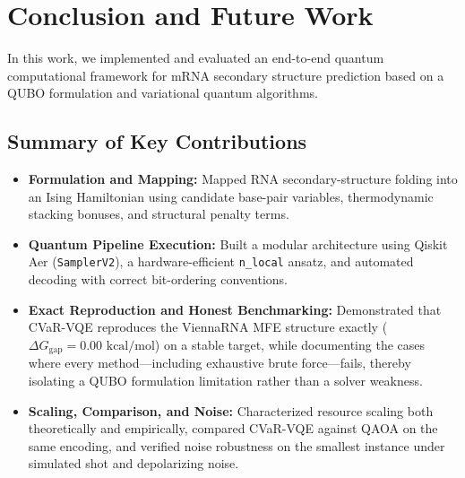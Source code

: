 \documentclass[11pt,a4paper]{article}
\begin{document}
	\section{Conclusion and Future Work}
	\label{sec:conclusion}
	
	In this work, we implemented and evaluated an end-to-end quantum computational framework for mRNA secondary structure prediction based on a QUBO formulation and variational quantum algorithms.
	
	\subsection{Summary of Key Contributions}
	\begin{itemize}[leftmargin=1.2cm]
		\item \textbf{Formulation and Mapping:} Mapped RNA secondary-structure folding into an Ising Hamiltonian using candidate base-pair variables, thermodynamic stacking bonuses, and structural penalty terms.
		\item \textbf{Quantum Pipeline Execution:} Built a modular architecture using Qiskit Aer (\texttt{SamplerV2}), a hardware-efficient \texttt{n\_local} ansatz, and automated decoding with correct bit-ordering conventions.
		\item \textbf{Exact Reproduction and Honest Benchmarking:} Demonstrated that CVaR-VQE reproduces the ViennaRNA MFE structure exactly ($\Delta G_{\text{gap}} = 0.00\text{ kcal/mol}$) on a stable target, while documenting the cases where every method---including exhaustive brute force---fails, thereby isolating a QUBO formulation limitation rather than a solver weakness.
		\item \textbf{Scaling, Comparison, and Noise:} Characterized resource scaling both theoretically and empirically, compared CVaR-VQE against QAOA on the same encoding, and verified noise robustness on the smallest instance under simulated shot and depolarizing noise.
	\end{itemize}
	
\end{document}
